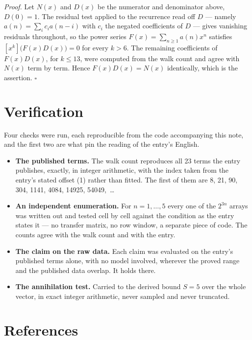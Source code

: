 \documentclass[11pt]{article}
\theoremstyle{definition}
\begin{document}
{\itshape Proof.} Let $N(x)$ and $D(x)$ be the numerator and denominator above, $D(0)=1$. The residual test applied to the recurrence read off $D$ --- namely $a(n) = \sum_i c_i a(n-i)$ with $c_i$ the negated coefficients of $D$ --- gives vanishing residuals throughout, so the power series $F(x)=\sum_{n\ge 1}a(n)x^n$ satisfies $[x^k]\bigl(F(x)D(x)\bigr) = 0$ for every $k > 6$. The remaining coefficients of $F(x)D(x)$, for $k \le 13$, were computed from the walk count and agree with $N(x)$ term by term. Hence $F(x)D(x) = N(x)$ identically, which is the assertion. $\square$

\section{Verification}

Four checks were run, each reproducible from the code accompanying this note, and the first two are what pin the reading of the entry's English.

\begin{itemize}

\item {\bfseries The published terms.} The walk count reproduces all 23 terms the entry publishes, exactly, in integer arithmetic, with the index taken from the entry's stated offset (1) rather than fitted. The first of them are 8, 21, 90, 304, 1141, 4084, 14925, 54049,~\dots

\item {\bfseries An independent enumeration.} For $n = 1,\dots,5$ every one of the $2^{3n}$ arrays was written out and tested cell by cell against the condition as the entry states it --- no transfer matrix, no row window, a separate piece of code. The counts agree with the walk count and with the entry.

\item {\bfseries The claim on the raw data.} Each claim was evaluated on the entry's published terms alone, with no model involved, wherever the proved range and the published data overlap. It holds there.

\item {\bfseries The annihilation test.} Carried to the derived bound $S = 5$ over the whole vector, in exact integer arithmetic, never sampled and never truncated.

\end{itemize}

\section{References}
\end{document}
